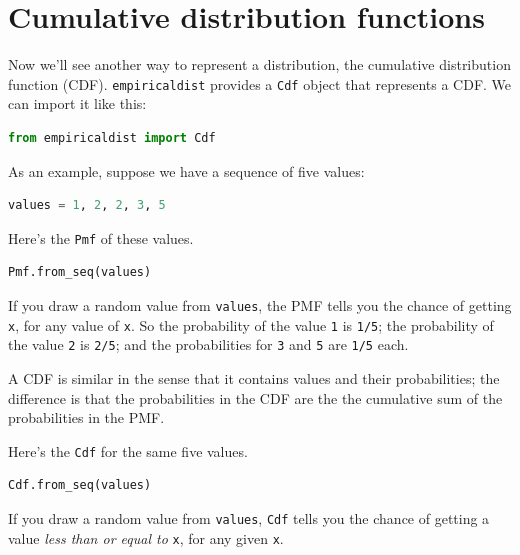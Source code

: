 \hypertarget{cumulative-distribution-functions}{%
\section{Cumulative distribution
functions}\label{cumulative-distribution-functions}}

Now we'll see another way to represent a distribution, the cumulative
distribution function (CDF). \passthrough{\lstinline!empiricaldist!}
provides a \passthrough{\lstinline!Cdf!} object that represents a CDF.
We can import it like this:

\begin{lstlisting}[language=Python,style=source]
from empiricaldist import Cdf
\end{lstlisting}

As an example, suppose we have a sequence of five values:

\begin{lstlisting}[language=Python,style=source]
values = 1, 2, 2, 3, 5  
\end{lstlisting}

Here's the \passthrough{\lstinline!Pmf!} of these values.

\begin{lstlisting}[language=Python,style=source]
Pmf.from_seq(values)
\end{lstlisting}

If you draw a random value from \passthrough{\lstinline!values!}, the
PMF tells you the chance of getting \passthrough{\lstinline!x!}, for any
value of \passthrough{\lstinline!x!}. So the probability of the value
\passthrough{\lstinline!1!} is \passthrough{\lstinline!1/5!}; the
probability of the value \passthrough{\lstinline!2!} is
\passthrough{\lstinline!2/5!}; and the probabilities for
\passthrough{\lstinline!3!} and \passthrough{\lstinline!5!} are
\passthrough{\lstinline!1/5!} each.

A CDF is similar in the sense that it contains values and their
probabilities; the difference is that the probabilities in the CDF are
the the cumulative sum of the probabilities in the PMF.

Here's the \passthrough{\lstinline!Cdf!} for the same five values.

\begin{lstlisting}[language=Python,style=source]
Cdf.from_seq(values)
\end{lstlisting}

If you draw a random value from \passthrough{\lstinline!values!},
\passthrough{\lstinline!Cdf!} tells you the chance of getting a value
\emph{less than or equal to} \passthrough{\lstinline!x!}, for any given
\passthrough{\lstinline!x!}.

